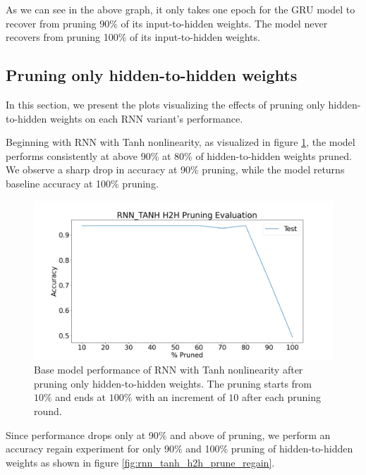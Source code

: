 As we can see in the above graph, it only takes one epoch for the GRU model to recover from pruning 90\% of its input-to-hidden weights. The model never recovers from pruning 100\% of its input-to-hidden weights.

\subsection{Pruning only hidden-to-hidden weights}

In this section, we present the plots visualizing the effects of pruning only hidden-to-hidden weights on each RNN variant's performance.

Beginning with RNN with Tanh nonlinearity, as visualized in figure \ref{fig:rnn_tanh_h2h_prune}, the model performs consistently at above 90\% at 80\% of hidden-to-hidden weights pruned. We observe a sharp drop in accuracy at 90\% pruning, while the model returns baseline accuracy at 100\% pruning.

\begin{figure}[h]
	\centering
	\includegraphics[width=0.8\linewidth]{images/results/pruning_h2h/rnn_tanh_h2h_pruning_evaluation.png}
	\caption[RNN\_Tanh base model performance after pruning h2h weights]%
	{Base model performance of RNN with Tanh nonlinearity after pruning only hidden-to-hidden weights. The pruning starts from $10\%$ and ends at $100\%$ with an increment of $10$ after each pruning round.}
	\label{fig:rnn_tanh_h2h_prune}
\end{figure}

Since performance drops only at 90\% and above of pruning, we perform an accuracy regain experiment for only 90\% and 100\% pruning of hidden-to-hidden weights as shown in figure \ref{fig:rnn_tanh_h2h_prune_regain}.

